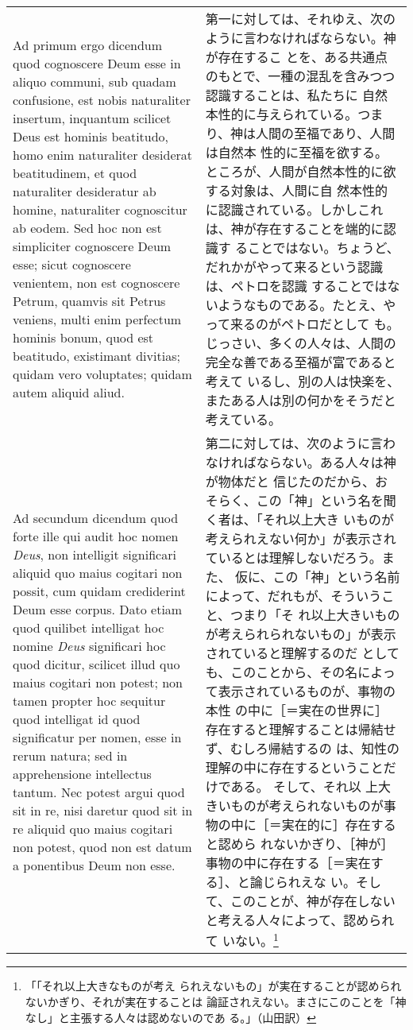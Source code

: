 \documentclass[10pt]{jsarticle} %
\begin{document}
\begin{longtable}{p{21em}p{21em}}
\\

{\sc Ad primum ergo dicendum} quod cognoscere Deum
esse in aliquo communi, sub quadam confusione, est nobis naturaliter
insertum, inquantum scilicet Deus est hominis beatitudo, homo enim
naturaliter desiderat beatitudinem, et quod naturaliter desideratur ab
homine, naturaliter cognoscitur ab eodem. Sed hoc non est simpliciter
cognoscere Deum esse; sicut cognoscere venientem, non est cognoscere
Petrum, quamvis sit Petrus veniens, multi enim perfectum hominis bonum,
quod est beatitudo, existimant divitias; quidam vero voluptates; quidam
autem aliquid aliud.


&
第一に対しては、それゆえ、次のように言わなければならない。神が存在するこ
 とを、ある共通点のもとで、一種の混乱を含みつつ認識することは、私たちに
 自然本性的に与えられている。つまり、神は人間の至福であり、人間は自然本
 性的に至福を欲する。ところが、人間が自然本性的に欲する対象は、人間に自
 然本性的に認識されている。しかしこれは、神が存在することを端的に認識す
 ることではない。ちょうど、だれかがやって来るという認識は、ペトロを認識
 することではないようなものである。たとえ、やって来るのがペトロだとして
 も。じっさい、多くの人々は、人間の完全な善である至福が富であると考えて
 いるし、別の人は快楽を、またある人は別の何かをそうだと考えている。

\\

{\sc Ad secundum dicendum} quod forte ille qui audit
hoc nomen {\it Deus}, non intelligit significari aliquid quo maius cogitari
non possit, cum quidam crediderint Deum esse corpus. Dato etiam quod
quilibet intelligat hoc nomine {\it Deus} significari hoc quod dicitur,
scilicet illud quo maius cogitari non potest; non tamen propter hoc
sequitur quod intelligat id quod significatur per nomen, esse in rerum
natura; sed in apprehensione intellectus tantum. Nec potest argui quod
sit in re, nisi daretur quod sit in re aliquid quo maius cogitari non
potest, quod non est datum a ponentibus Deum non esse.


 &

 第二に対しては、次のように言わなければならない。ある人々は神が物体だと
 信じたのだから、おそらく、この「神」という名を聞く者は、「それ以上大き
 いものが考えられえない何か」が表示されているとは理解しないだろう。また、
 仮に、この「神」という名前によって、だれもが、そういうこと、つまり「そ
 れ以上大きいものが考えられられないもの」が表示されていると理解するのだ
 としても、このことから、その名によって表示されているものが、事物の本性
 の中に［＝実在の世界に］存在すると理解することは帰結せず、むしろ帰結するの
 は、知性の理解の中に存在するということだけである。
そして、それ以
上大きいものが考えられないものが事物の中に［＝実在的に］存在すると認めら
 れないかぎり、［神が］事物の中に存在する［＝実在する］、と論じられえな
 い。そして、このことが、神が存在しないと考える人々によって、認められて
 いない。\footnote{「「それ以上大きなものが考え
られえないもの」が実在することが認められないかぎり、それが実在することは
論証されえない。まさにこのことを「神なし」と主張する人々は認めないのであ
る。」（山田訳）}




\end{longtable}
\end{document}
